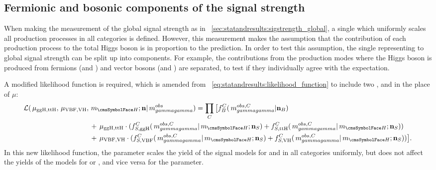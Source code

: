 \subsection{Fermionic and bosonic components of the signal strength}
\label{sec:statandresults:rvrf}

When making the measurement of the global signal strength as in \Sec~\ref{sec:statandresults:sigstrength_global}, a single \POI which uniformly scales all production processes in all categories is defined. However, this measurement makes the assumption that the contribution of each production process to the total Higgs boson \crosssection is in proportion to the \SM prediction. 
In order to test this assumption, the single \POI representing to global signal strength can be split up into components. For example, the contributions from the production modes where the Higgs boson is produced from fermions (\ggH and \ttH) and vector bosons (\VBF and \VH) are separated, to test if they individually agree with the \SM expectation. 

A modified likelihood function is required, which is amended from \Eq~\ref{eq:statandresults:likelihood_function} to include two \POI\s, \muF and \muV in the place of $\mu$:
\begin{equation}
\label{eq:statandresults:likelihood_function_muVmuF}
\begin{split} 
\mathcal{L}(\muF, \muV,{}& \mH; \mathbf{n} | \mgg^{obs} ) = \prod_{C} \big[ f^C_B(\mgg^{obs,C} | \mathbf{n}_B )   \\
& +\muF \cdot ( f^C_{S,{\text{ggH}}}(\mgg^{obs,C} |\mH ; \mathbf{n}_S) + f^C_{S,{\text{ttH}}}(\mgg^{obs,C} |\mH ; \mathbf{n}_S) ) \\ 
& +\muV \cdot ( f^C_{S,{\text{VBF}}}(\mgg^{obs,C} |\mH ; \mathbf{n}_S) + f^C_{S,{\text{VH}}}(\mgg^{obs,C} |\mH ; \mathbf{n}_S) )\big].
 \end{split} 
\end{equation}
In this new likelihood function, the \muF parameter scales the yield of the signal models for \ggH and \ttH in all categories uniformly, but does not affect the yields of the models for \VBF or \VH, and vice versa for the \muV parameter.

